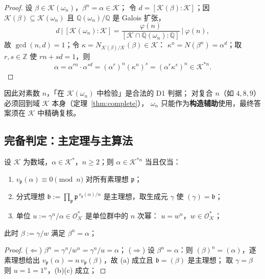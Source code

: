 \documentclass[UTF8,a4paper,11pt]{ctexart}
\begin{document}
\begin{proof}
设 $\beta\in\mathscr{K}(\omega_n)$，$\beta^n=\alpha\in\mathscr{K}$；
令 $d=[\mathscr{K}(\beta):\mathscr{K}]$；因 $\mathscr{K}(\beta)\subseteq\mathscr{K}(\omega_n)$
且 $\mathbb{Q}(\omega_n)/\mathbb{Q}$ 是 Galois 扩张，
\[
d\ \big|\ [\mathscr{K}(\omega_n):\mathscr{K}]
=\frac{\varphi(n)}{[\mathscr{K}\cap\mathbb{Q}(\omega_n):\mathbb{Q}]}\ \big|\ \varphi(n),
\]
故 $\gcd(n,d)=1$；令 $\kappa=N_{\mathscr{K}(\beta)/\mathscr{K}}(\beta)\in\mathscr{K}$：
$\kappa^n=N(\beta^n)=\alpha^d$；取 $r,s\in\mathbb{Z}$ 使 $rn+sd=1$，则
\[
\alpha=\alpha^{rn}\cdot\alpha^{sd}=(\alpha^r)^n(\kappa^n)^s=(\alpha^r\kappa^s)^n\in\mathscr{K}^{*n}.
\]
\end{proof}

因此对素数 $n$，「在 $\mathscr{K}(\omega_n)$ 中检验」是合法的 D1 判据；
对复合 $n$（如 $4,8,9$）必须回到域 $\mathscr{K}$ 本身（定理~\ref{thm:complete}），
$\omega_n$ 只能作为\textbf{构造辅助}使用，最终答案须在 $\mathscr{K}$ 中精确复核。
\subsection{完备判定：主定理与主算法}
\label{sec:complete}

\begin{theorem}[D1 的完备判定]
\label{thm:complete}
设 $\mathscr{K}$ 为数域，$\alpha\in\mathscr{K}^*$，$n\ge2$；则 $\alpha\in\mathscr{K}^{*n}$
当且仅当：
\begin{enumerate}
\item[(a)] $v_{\mathfrak{p}}(\alpha)\equiv0\pmod n$ 对所有素理想 $\mathfrak{p}$；
\item[(b)] 分式理想
$\displaystyle\mathfrak{b}:=\prod_{\mathfrak{p}}\mathfrak{p}^{\,v_{\mathfrak{p}}(\alpha)/n}$
是主理想，取生成元 $\gamma$ 使 $(\gamma)=\mathfrak{b}$；
\item[(c)] 单位 $u:=\gamma^n/\alpha\in\mathscr{O}_{\mathscr{K}}^*$ 是单位群中的 $n$ 次幂：
$u=w^n$，$w\in\mathscr{O}_{\mathscr{K}}^*$；
\end{enumerate}
此时 $\beta:=\gamma/w$ 满足 $\beta^n=\alpha$；
\end{theorem}

\begin{proof}
($\Leftarrow$) $\beta^n=\gamma^n/w^n=\gamma^n/u=\alpha$；
($\Rightarrow$) 设 $\beta^n=\alpha$：则 $(\beta)^n=(\alpha)$，逐素理想给出
$v_{\mathfrak{p}}(\alpha)=n\,v_{\mathfrak{p}}(\beta)$，故 (a) 成立且 $\mathfrak{b}=(\beta)$ 是主理想；
取 $\gamma=\beta$ 则 $u=1=1^n$，(b)(c) 成立；
\end{proof}
\end{document}
